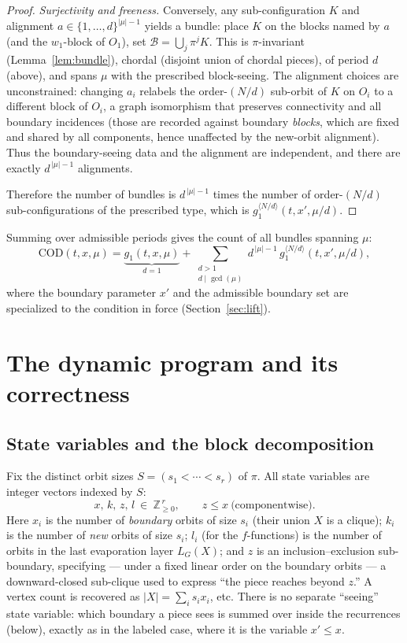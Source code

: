 \documentclass[11pt]{article}
\theoremstyle{plain}
\theoremstyle{definition}
\newcommand{\Z}{\mathbb{Z}}
\newcommand{\orb}{\mathcal{B}}
\begin{document}
\begin{proof}
\emph{Surjectivity and freeness.} Conversely, any sub-configuration $K$ and alignment
$a\in\{1,\dots,d\}^{|\mu|-1}$ yields a bundle: place $K$ on the blocks named by $a$ (and the
$w_1$-block of $O_1$), set $\orb=\bigcup_j\pi^jK$. This is $\pi$-invariant (Lemma~\ref{lem:bundle}),
chordal (disjoint union of chordal pieces), of period $d$ (above), and spans $\mu$ with the
prescribed block-seeing. The alignment choices are unconstrained: changing $a_i$ relabels the
order-$(N/d)$ sub-orbit of $K$ on $O_i$ to a different block of $O_i$, a graph isomorphism that
preserves connectivity and all boundary incidences (those are recorded against boundary
\emph{blocks}, which are fixed and shared by all components, hence unaffected by the new-orbit
alignment). Thus the boundary-seeing data and the alignment are independent, and there are exactly
$d^{\,|\mu|-1}$ alignments.

Therefore the number of bundles is $d^{\,|\mu|-1}$ times the number of order-$(N/d)$
sub-configurations of the prescribed type, which is $g_1^{\langle N/d\rangle}(t,x',\mu/d)$.
\end{proof}

Summing over admissible periods gives the count of all bundles spanning $\mu$:
\begin{equation}\label{eq:codsum}
\text{COD}(t,x,\mu)=\underbrace{g_1(t,x,\mu)}_{d=1}
   +\sum_{\substack{d>1\\ d\mid\gcd(\mu)}} d^{\,|\mu|-1}\,g_1^{\langle N/d\rangle}(t,x',\mu/d),
\end{equation}
where the boundary parameter $x'$ and the admissible boundary set are specialized to the condition
in force (Section~\ref{sec:lift}).

\section{The dynamic program and its correctness}\label{sec:dp}

\subsection{State variables and the block decomposition}\label{sec:state}

Fix the distinct orbit sizes $S=(s_1<\cdots<s_r)$ of $\pi$. All state variables are integer vectors
indexed by $S$:
\[
x,\,k,\,z,\,l\ \in\ \Z_{\ge0}^{\,r},\qquad z\le x\ \text{(componentwise)}.
\]
Here $x_i$ is the number of \emph{boundary} orbits of size $s_i$ (their union $X$ is a clique);
$k_i$ is the number of \emph{new} orbits of size $s_i$; $l_i$ (for the $f$-functions) is the number
of orbits in the last evaporation layer $L_G(X)$; and $z$ is an inclusion--exclusion sub-boundary,
specifying — under a fixed linear order on the boundary orbits — a downward-closed sub-clique used to
express ``the piece reaches beyond $z$.'' A vertex count is recovered as $|X|=\sum_i s_i x_i$, etc.
There is no separate ``seeing'' state variable: which boundary a piece sees is summed over inside the
recurrences (below), exactly as in the labeled case, where it is the variable $x'\le x$.
\end{document}
